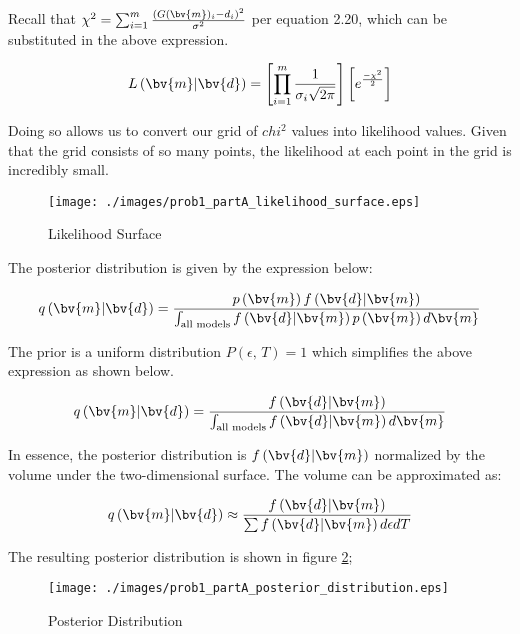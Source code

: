 Recall that $\chi^2 = \sum_{i=1}^{m} \frac{\left(G(\bv{m})_i - d_i\right)^2}{\sigma^2}$ per equation 2.20, which can be substituted in the above expression. 

\begin{align*}
	L\left(\bv{m}|\bv{d}\right) = \left[\prod_{i=1}^{m}\frac{1}{\sigma_i\sqrt{2\pi}}\right] \left[e^{\frac{-\chi^2}{2}}\right]
\end{align*}

Doing so allows us to convert our grid of $chi^2$ values into likelihood values. Given that the grid consists of so many points, the likelihood at each point in the grid is incredibly small. 

\begin{figure}[h] 
	\centering
	\texttt{[image: ./images/prob1\_partA\_likelihood\_surface.eps]}
	\caption{Likelihood Surface}
	\label{fig: prob1 likelihood surface}
\end{figure}
\FloatBarrier

The posterior distribution is given by the expression below:

\begin{align*}
	q\left(\bv{m}|\bv{d}\right) = \frac{p\left(\bv{m}\right) f\left(\bv{d}|\bv{m}\right)}{\int_{\textrm{all models}} f\left(\bv{d}|\bv{m}\right) p\left(\bv{m}\right) d\bv{m}}
\end{align*}

The prior is a uniform distribution $P\left(\epsilon,\,T\right) = 1$ which simplifies the above expression as shown below.

\begin{align*}
	q\left(\bv{m}|\bv{d}\right) = \frac{f\left(\bv{d}|\bv{m}\right)}{\int_{\textrm{all models}} f\left(\bv{d}|\bv{m}\right) d\bv{m}}
\end{align*}

In essence, the posterior distribution is $f\left(\bv{d}|\bv{m}\right)$ normalized by the volume under the two-dimensional surface. The volume can be approximated as:

\begin{align*}
	q\left(\bv{m}|\bv{d}\right) \approx \frac{f\left(\bv{d}|\bv{m}\right)}{\sum f\left(\bv{d}|\bv{m}\right) d\epsilon dT}
\end{align*}

The resulting posterior distribution is shown in figure \ref{fig: prob1 posterior distribution};

\begin{figure}[h] 
	\centering
	\texttt{[image: ./images/prob1\_partA\_posterior\_distribution.eps]}
	\caption{Posterior Distribution}
	\label{fig: prob1 posterior distribution}
\end{figure}
\FloatBarrier


